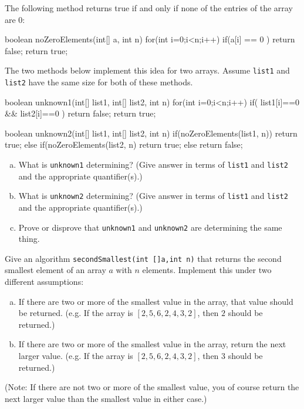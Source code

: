 \begin{pro}
The following method returns true if and only if none of the entries of the array are 0:
\begin{code}
	boolean noZeroElements(int[] a, int n) {
	    for(int i=0;i<n;i++) {
	        if(a[i] == 0 )
	            return false;
	    }
	    return true;
	}
\end{code}

The two methods below implement this idea for two arrays.
Assume \verb+list1+ and \verb+list2+ have the same size for both of these methods.
{\small
\begin{code}
	boolean unknown1(int[] list1, int[] list2, int n) {
	    for(int i=0;i<n;i++) {
	        if( list1[i]==0 && list2[i]==0 )
	            return false;
	    }
	    return true;
	}
	
	boolean unknown2(int[] list1, int[] list2, int n) {
	    if(noZeroElements(list1, n)) {
	        return true;
	    } else if(noZeroElements(list2, n) {
	        return true;
	    } else {
	        return false;
	    }
	}
\end{code}
}
\begin{enumerate}[(a)]
\item
What is \verb+unknown1+ determining? (Give answer in terms of \verb+list1+ and \verb+list2+ and the
appropriate quantifier(s).)
\item
What is \verb+unknown2+ determining? (Give answer in terms of \verb+list1+ and \verb+list2+ and the
appropriate quantifier(s).)
\item
Prove or disprove that \verb+unknown1+ and \verb+unknown2+ are determining the same thing.
\end{enumerate}
\end{pro}





\begin{pro}
Give an algorithm \verb+secondSmallest(int []a,int n)+
that returns the second smallest element of an array $a$ with $n$ elements.
Implement this under two different assumptions:
\begin{enumerate}[(a)]
\item
If there are two or more of the smallest value in the array, that value should be returned.
(e.g. If the array is $[2, 5, 6, 2, 4, 3, 2]$, then $2$ should be returned.)
\item
If there are two or more of the smallest value in the array, return the next larger value.
(e.g. If the array is $[2, 5, 6, 2, 4, 3, 2]$, then $3$ should be returned.)
\end{enumerate}
(Note: If there are not two or more of the smallest value, you of course return the next larger value
than the smallest value in either case.)
\end{pro}

